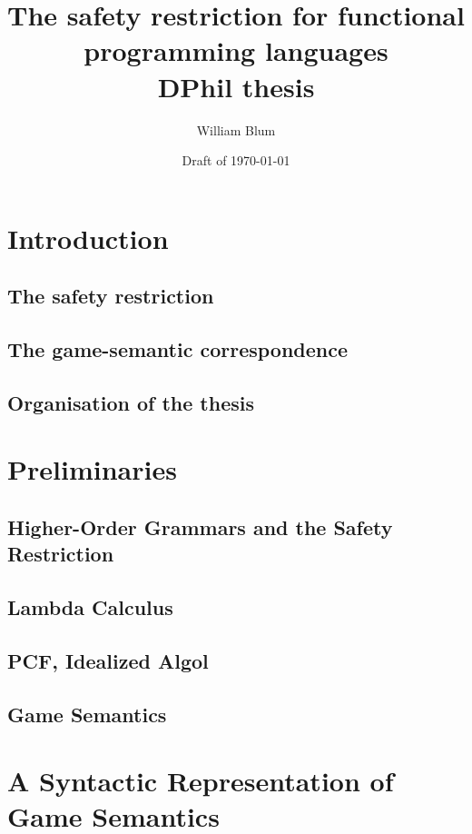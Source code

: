 


\author{William Blum}
\title{The safety restriction for functional programming languages\\{\small DPhil thesis}}
\date{Draft of \today}


\maketitle \tableofcontents


\chapter{Introduction}
    \section{The safety restriction}
    \section{The game-semantic correspondence}
    \section{Organisation of the thesis}

\chapter{Preliminaries}
    \section{Higher-Order Grammars and the Safety Restriction}
    \section{Lambda Calculus}
    \section{PCF, Idealized Algol}
    \section{Game Semantics}

\chapter{A Syntactic Representation of Game Semantics}
    
